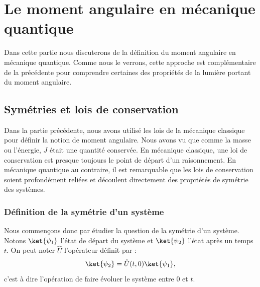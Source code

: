 

\chapter{Le moment angulaire en mécanique quantique}
Dans cette partie nous discuterons de la définition du moment angulaire en mécanique quantique. Comme nous le verrons, cette approche est complémentaire de la précédente pour comprendre certaines des propriétés de la lumière portant du moment angulaire. 

\section{Symétries et lois de conservation}

Dans la partie précédente, nous avons utilisé les lois de la mécanique classique pour définir la notion de moment angulaire. Nous avons vu que comme la masse ou l'énergie, $J$ était une quantité conservée. En mécanique classique, une loi de conservation est presque toujours le point de départ d'un raisonnement. En mécanique quantique au contraire, il est remarquable que les lois de conservation soient profondément reliées et découlent directement des propriétés de symétrie des systèmes. 

\subsection{Définition de la symétrie d'un système}
Nous commençons donc par étudier la question de la symétrie d'un système. Notons $\ket{\psi_1}$ l'état de départ du système et $\ket{\psi_2}$ l'état après un temps $t$. On peut noter $\hat{U}$ l'opérateur définit par :
\begin{equation*}
\ket{\psi_2}=\hat{U}(t,0)\ket{\psi_1},
\end{equation*}
c'est à dire l'opération de faire évoluer le système entre 0 et $t$.

